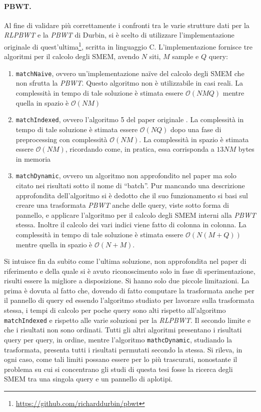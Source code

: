 \paragraph{PBWT.}
Al fine di validare più correttamente i confronti tra le varie strutture dati
per la \textit{RLPBWT} e la \textit{PBWT} di Durbin, si è scelto di utilizzare
l'implementazione originale di
quest'ultima\footnote{\url{https://github.com/richarddurbin/pbwt}}, scritta in 
linguaggio C. L'implementazione
fornisce tre algoritmi per il calcolo degli SMEM, avendo $N$ siti, $M$ sample e
$Q$ query:
\begin{enumerate}
  \item \texttt{matchNaive}, ovvero un'implementazione na\"{i}ve del calcolo
  degli SMEM che non sfrutta la \textit{PBWT}. Questo algoritmo non è
  utilizzabile in casi reali. La complessità in tempo di tale 
  soluzione è stimata essere $\mathcal{O}(NMQ)$ mentre quella in spazio è
  $\mathcal{O}(NM)$
  \item \texttt{matchIndexed}, ovvero l'algoritmo 5 del paper originale
  \cite{pbwt}. La complessità in tempo di tale 
  soluzione è stimata essere $\mathcal{O}(NQ)$ dopo una fase di preprocessing
  con complessità $\mathcal{O}(NM)$. La complessità in spazio è stimata essere
  $\mathcal{O}(NM)$, ricordando come, in pratica, essa corrisponda a $13NM$
  bytes in memoria
  \item \texttt{matchDynamic}, ovvero un algoritmo non approfondito nel paper ma
  solo citato nei risultati sotto il nome di ``batch''. Pur mancando una
  descrizione approfondita dell'algoritmo si è dedotto che il suo funzionamento
  si basi sul creare una trasformata \textit{PBWT} anche delle query, viste
  sotto forma di pannello, e applicare l'algoritmo per il calcolo degli SMEM
  interni alla \textit{PBWT} stessa. Inoltre il calcolo dei vari indici viene
  fatto di colonna in colonna. La complessità in tempo di tale 
  soluzione è stimata essere $\mathcal{O}(N(M+Q))$ mentre quella in spazio è
  $\mathcal{O}(N+M)$. 
\end{enumerate}
Si intuisce fin da subito come l'ultima soluzione, non approfondita nel paper di
riferimento e della quale si è avuto riconoscimento solo in fase di
sperimentazione, risulti essere la migliore a disposizione. Si hanno solo due
piccole limitazioni. La prima è dovuta al fatto che, dovendo di fatto computare
la trasformata anche per il pannello di query ed essendo l'algoritmo studiato
per lavorare sulla trasformata stessa, i tempi di calcolo per poche query sono
alti rispetto all'algoritmo \texttt{matchIndexed} e rispetto alle varie
soluzioni per la \textit{RLPBWT}. Il secondo limite e che i risultati non sono
ordinati. Tutti gli altri algoritmi presentano i risultati query per query, in
ordine, mentre l'algoritmo \texttt{mathcDynamic}, studiando la trasformata,
presenta tutti i risultati permutati secondo la stessa. Si rileva, in ogni caso,
come tali limiti possano essere per lo più trascurati, nonostante il problema su
cui si concentrano gli studi di questa tesi fosse la ricerca degli SMEM tra una
singola query e un pannello di aplotipi.

